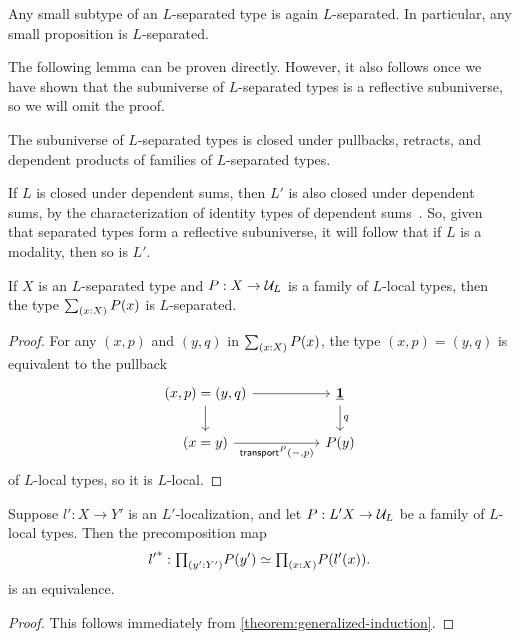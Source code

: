 \begin{lem}
Any small subtype of an $L$-separated type is again $L$-separated. In particular, any small proposition is $L$-separated.
\end{lem}

The following lemma can be proven directly. However, it also follows once we have shown that the subuniverse of $L$-separated types is a reflective subuniverse, so we will omit the proof.

\begin{lem}
The subuniverse of $L$-separated types is closed under pullbacks, retracts, and dependent products of families of $L$-separated types.
\end{lem}

\begin{rmk}
If $L$ is closed under dependent sums, then $L'$ is also closed under dependent sums,
    by the characterization of identity types of dependent sums~\cite[Theorem~2.7.2]{hottbook}.
    So, given that separated types form a reflective subuniverse, it will follow that if $L$ is a modality,
    then so is $L'$.
\end{rmk}

\begin{prp}\label{lemma:separatedpluslocalisseparated}
If $X$ is an $L$-separated type and $P:X\to \mathcal{U}_L$ is a family of $L$-local types, then the type
$\sm{x:X}P(x)$ is $L$-separated.
\end{prp}

\begin{proof}
For any $(x,p)$ and $(y,q)$ in $\sm{x:X}P(x)$, the type $(x,p)=(y,q)$ is equivalent to the pullback
\[
  \begin{tikzcd}[column sep=huge]
    (x,p)=(y,q) \arrow[r] \arrow[d] & \unit \arrow[d,"q"] \\
    (x=y) \arrow[r,swap,"\transfib{P}{-}{p}"] & P(y)
  \end{tikzcd}
\]
of $L$-local types, so it is $L$-local. 
\end{proof}

\begin{cor}\label{proposition:inductionLseparated}
Suppose $l':X\to Y'$ is an $L'$-localization, and let $P:L'X \to \mathcal{U}_L$ be a family of $L$-local types.
Then the precomposition map
\[
    \precomp{l'}: \prd{y':Y'} P(y') \simeq \prd{x : X} P(l'(x)).
\]
is an equivalence.
\end{cor}

\begin{proof}
This follows immediately from \cref{theorem:generalized-induction}.
\end{proof}

